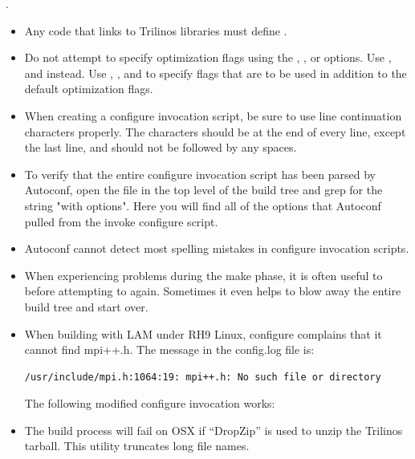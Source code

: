 .

\begin{itemize}

\item Any code that links to Trilinos libraries must define
.

\item Do not attempt to specify optimization flags using the
, , or
 options.   Use ,
 and  instead.  Use
, , and
 to specify flags that are to be used in
addition to the default optimization flags.
                                                                                
\item When creating a configure invocation script, be sure to use
line continuation characters properly.  The characters should be at the
end of every line, except the last line, and should not be followed by any
spaces.
                                                                                
\item To verify that the entire configure invocation script has been parsed by
Autoconf, open the  file in the top level of
the build tree and grep for the string "with options".  Here you will find all
of the options that Autoconf pulled from the invoke configure script.
                                                                                
\item Autoconf cannot detect most
spelling mistakes in configure invocation scripts.

\item When experiencing problems during the make phase, it is often useful to
 before attempting to  again.
Sometimes it even helps to blow away the entire build tree and start over.
                                                                                
\item When building with LAM under RH9 Linux, configure complains that it
cannot find mpi++.h.  The message in the config.log file is:
\begin{verbatim}
/usr/include/mpi.h:1064:19: mpi++.h: No such file or directory
\end{verbatim}
The following modified configure invocation works:
                                                                                
\item The build process will fail on OSX if ``DropZip'' is used to
unzip the Trilinos tarball.  This utility truncates long file names.

\end{itemize}

